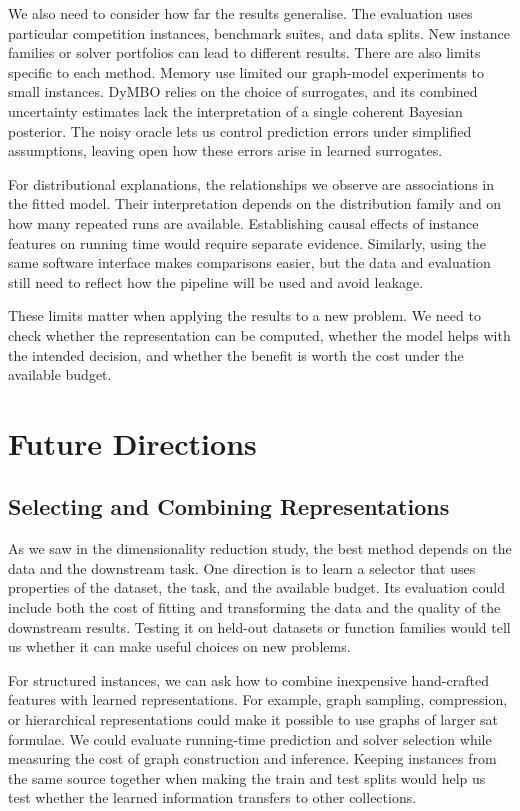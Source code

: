 We also need to consider how far the results generalise. The evaluation uses particular competition instances, benchmark suites, and data splits. New instance families or solver portfolios can lead to different results. There are also limits specific to each method. Memory use limited our graph-model experiments to small instances. DyMBO relies on the choice of surrogates, and its combined uncertainty estimates lack the interpretation of a single coherent Bayesian posterior. The noisy oracle lets us control prediction errors under simplified assumptions, leaving open how these errors arise in learned surrogates.

For distributional explanations, the relationships we observe are associations in the fitted model. Their interpretation depends on the distribution family and on how many repeated runs are available. Establishing causal effects of instance features on running time would require separate evidence. Similarly, using the same software interface makes comparisons easier, but the data and evaluation still need to reflect how the pipeline will be used and avoid leakage.

These limits matter when applying the results to a new problem. We need to check whether the representation can be computed, whether the model helps with the intended decision, and whether the benefit is worth the cost under the available budget.

\section{Future Directions}
\label{sec:ch12:future}

\subsection{Selecting and Combining Representations}

As we saw in the dimensionality reduction study, the best method depends on the data and the downstream task. One direction is to learn a selector that uses properties of the dataset, the task, and the available budget. Its evaluation could include both the cost of fitting and transforming the data and the quality of the downstream results. Testing it on held-out datasets or function families would tell us whether it can make useful choices on new problems.

For structured instances, we can ask how to combine inexpensive hand-crafted features with learned representations. For example, graph sampling, compression, or hierarchical representations could make it possible to use graphs of larger \gls{sat} formulae. We could evaluate running-time prediction and solver selection while measuring the cost of graph construction and inference. Keeping instances from the same source together when making the train and test splits would help us test whether the learned information transfers to other collections.

